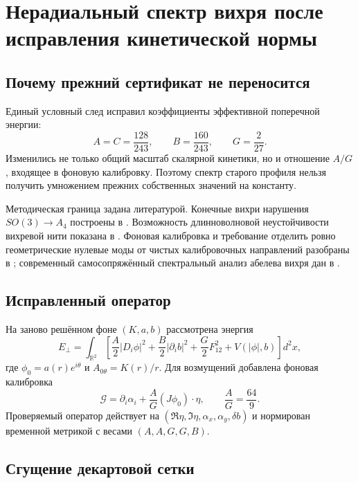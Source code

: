 \chapter{Нерадиальный спектр вихря после исправления кинетической нормы}

\section{Почему прежний сертификат не переносится}

Единый условный след исправил коэффициенты эффективной поперечной энергии:
\begin{equation}
 A=C=\frac{128}{243},\qquad
 B=\frac{160}{243},\qquad
 G=\frac{2}{27}.
 \label{eq:v6-corrected-angular-coefficients}
\end{equation}
Изменились не только общий масштаб скалярной кинетики, но и отношение
$A/G$, входящее в фоновую калибровку. Поэтому спектр старого профиля
нельзя получить умножением прежних собственных значений на константу.

Методическая граница задана литературой. Конечные вихри нарушения
$SO(3)\to A_4$ построены в . Возможность
длинноволновой неустойчивости вихревой нити показана в
. Фоновая калибровка и требование отделить ровно
геометрические нулевые моды от чистых калибровочных направлений разобраны
в ; современный самосопряжённый спектральный
анализ абелева вихря дан в .

\section{Исправленный оператор}

На заново решённом фоне $(K,a,b)$ рассмотрена энергия
\begin{equation}
 E_\perp=\int_{\mathbb R^2}\left[
 \frac A2|D_i\phi|^2+\frac B2|\partial_i b|^2
 +\frac G2F_{12}^2+V(|\phi|,b)\right]d^2x,
\end{equation}
где $\phi_0=a(r)e^{i\theta}$ и $A_{0\theta}=K(r)/r$.
Для возмущений добавлена фоновая калибровка
\begin{equation}
 \mathcal G=\partial_i\alpha_i+\frac AG(J\phi_0)\mathbin{\cdot}\eta,
 \qquad \frac AG=\frac{64}{9}.
\end{equation}
Проверяемый оператор действует на
$(\Re\eta,\Im\eta,\alpha_x,\alpha_y,\delta b)$ и нормирован временной
метрикой с весами $(A,A,G,G,B)$.

\section{Сгущение декартовой сетки}

